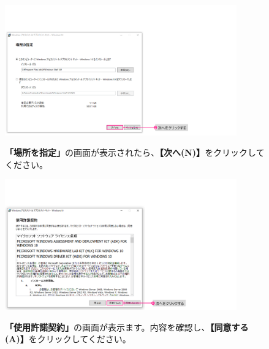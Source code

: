 \begin{figure}[hp]
    \begin{minipage}{0.6\textwidth}
        \vspace{0cm}
        \includegraphics[width=10cm]{figures/Install_WinADK-03.png}
    \end{minipage}
    \begin{minipage}{0.4\textwidth}
        \textbf{「場所を指定」}の画面が表示されたら、\textbf{【次へ(N)】}をクリックしてください。
    \end{minipage}
\end{figure}

\begin{figure}[hp]
    \begin{minipage}{0.6\textwidth}
        \vspace{0cm}
        \includegraphics[width=10cm]{figures/Install_WinADK-04.png}
    \end{minipage}
    \begin{minipage}{0.4\textwidth}
        \textbf{「使用許諾契約」}の画面が表示ます。内容を確認し、\textbf{【同意する(A)】}をクリックしてください。
    \end{minipage}
\end{figure}

